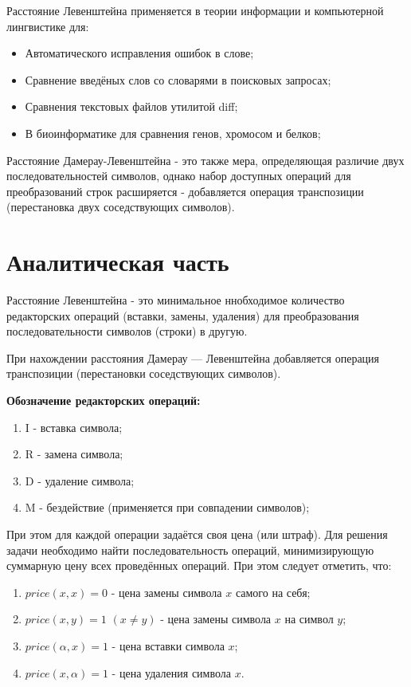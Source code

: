 \documentclass[12pt]{report}
\begin{document}
Расстояние Левенштейна применяется в теории информации и компьютерной лингвистике для:

\begin{itemize}
	\item Автоматического исправления ошибок в слове;
	\item Сравнение введёных слов со словарями в поисковых запросах;
	\item Сравнения текстовых файлов утилитой diff;
	\item В биоинформатике для сравнения генов, хромосом и белков;
\end{itemize}

Расстояние Дамерау-Левенштейна - это также мера, определяющая различие двух последовательностей символов, однако набор доступных операций для преобразований строк расширяется - добавляется операция транспозиции (перестановка двух соседствующих символов).

\chapter{Аналитическая часть}
Расстояние Левенштейна - это минимальное ннобходимое количество редакторских операций (вставки, замены, удаления) для преобразования последовательности символов (строки) в другую.

При нахождении расстояния Дамерау — Левенштейна добавляется операция транспозиции (перестановки соседствующих символов).  
 
\textbf{Обозначение редакторских операций:} 
\begin{enumerate}
	\item I - вставка символа;
	\item R - замена символа;
	\item D - удаление символа;
	\item M - бездействие (применяется при совпадении символов);
\end{enumerate}

При этом для каждой операции задаётся своя цена (или штраф). Для решения задачи необходимо найти последовательность операций, минимизирующую суммарную цену всех проведённых операций. При этом следует отметить, что:
\begin{enumerate}
	\item $price(x, x) = 0$ - цена замены символа $x$ самого на себя;
	\item $price(x, y) = 1$   $(x \neq y)$ - цена замены символа $x$ на символ $y$;
	\item $price(\alpha, x) = 1$ - цена вставки символа $x$;
	\item $price(x, \alpha) = 1$ - цена удаления символа $x$.
\end{enumerate}
\end{document}

